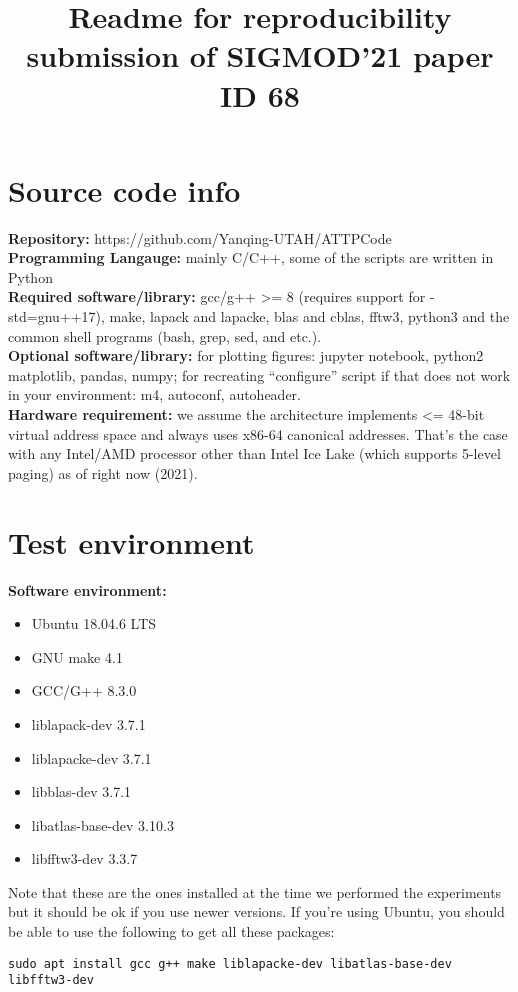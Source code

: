\documentclass[11pt]{article}
\title{Readme for reproducibility submission of SIGMOD'21 paper ID 68}
\author{}
\date{}
\newenvironment{pkl}{%
\begin{itemize}%
\setlength\itemsep{-0.5\parskip}%
\setlength\parsep{0in}%
}{%
\end{itemize}}
\begin{document}
\maketitle

\section{Source code info}

{\bf Repository:} https://github.com/Yanqing-UTAH/ATTPCode\\
{\bf Programming Langauge:} mainly C/C++, some of the scripts are written in
Python\\
{\bf Required software/library:} gcc/g++ >= 8 (requires support for
-std=gnu++17), make, lapack and lapacke, blas and cblas, fftw3,
python3 and the common shell programs (bash, grep, sed, and etc.).\\
{\bf Optional software/library:} for plotting figures: jupyter notebook, python2
matplotlib, pandas, numpy; for recreating ``configure'' script if that
does not work in your environment: m4, autoconf, autoheader.  \\
{\bf Hardware requirement:} we assume the architecture implements <= 48-bit
virtual address space and always uses x86-64 canonical addresses.
That's the case with any Intel/AMD processor other than Intel Ice Lake
(which supports 5-level paging) as of right now (2021).

\section{Test environment}
{\bf Software environment:}
\begin{pkl}
	\item Ubuntu 18.04.6 LTS
    \item GNU make 4.1
	\item GCC/G++ 8.3.0
	\item liblapack-dev 3.7.1
	\item liblapacke-dev 3.7.1
	\item libblas-dev 3.7.1
	\item libatlas-base-dev 3.10.3
	\item libfftw3-dev 3.3.7
\end{pkl}
Note that these are the ones installed at the
time we performed the experiments but it should be ok if you use newer
versions. If you're using Ubuntu, you should be able to use the
following to get all these packages:
\begin{verbatim}
sudo apt install gcc g++ make liblapacke-dev libatlas-base-dev libfftw3-dev
\end{verbatim}
\end{document}
